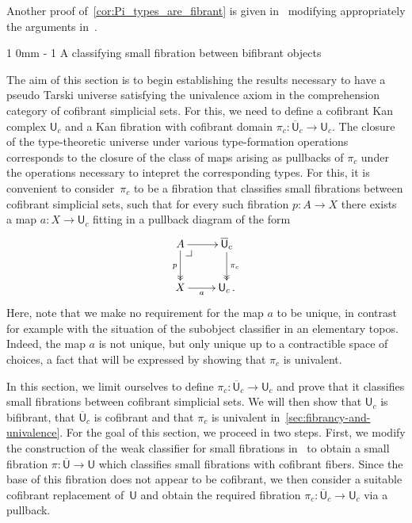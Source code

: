 \documentclass[reqno,10pt,a4paper,oneside,draft]{amsart}
\makeatletter
\renewcommand{\section}{\@startsection
{section}%
{1}%
{0mm}%
{-\baselineskip}%
{1\baselineskip}%
{\Large \bfseries}}%
\numberwithin{equation}{section}
\theoremstyle{mythm}
\theoremstyle{mydef}
\theoremstyle{myrmk}
\newcommand{\pullback}[1]{\save*!/#1-1.2pc/#1:(-1,1)@^{|-}\restore}
\newcommand{\drpullback}{\pullback{dr}}
\newcommand{\ie}{\text{i.e.\ }}
\newcommand{\co}{\colon}
\newcommand{\UU}{\overline{\mathsf{U}}}
\newcommand{\U}{\mathsf{U}}
\makeatother
\begin{document}
 
 Another proof of~\cref{cor:Pi_types_are_fibrant} is given in~\cite{GambinoN:anocp} modifying appropriately
the arguments in~\cite{SattlerC:equepu}.


\section{A  classifying small fibration between bifibrant objects}
\label{sec:unifbb}


The aim of this section is to begin establishing the results necessary to have a pseudo Tarski
universe satisfying the univalence axiom in the comprehension category of cofibrant simplicial
sets. For this, we need to define a cofibrant Kan complex $\U_c$ and a Kan 
fibration with cofibrant domain $\pi_c \co \UU_c \to \U_c$. The closure of the type-theoretic universe under various type-formation operations
corresponds to the closure of the class of maps arising as pullbacks of $\pi_c$ under the 
operations necessary to intepret the corresponding types. For this, it is convenient to 
consider~$\pi_c$ to be a fibration that classifies small fibrations between cofibrant simplicial
sets, \ie such that for every such fibration $p \co A \to X$ there exists a map $a \co X \to \U_c$ fitting in a pullback diagram of the form
\[
\xymatrix{
A \drpullback \ar[r] \ar@{->>}[d]_p   & \UU_c \ar@{->>}[d]^{\pi_c} \\
X \ar[r]_-a &  \U_c \, .}
\]
Here, note that we make no requirement for
the map $a$ to be unique, in contrast for example with the situation of the subobject classifier
in an elementary topos. Indeed, the map $a$ is not unique, but only unique  up to a contractible space
of choices, a fact that will be expressed by showing that $\pi_c$ is univalent. 

In this section, we limit ourselves to define $\pi_c \co \UU_c \to \U_c$ and prove that it
classifies small fibrations between cofibrant simplicial sets. We will then show 
that $\U_c$ is bifibrant, that $\UU_c$ is cofibrant  and that $\pi_c$ is univalent 
in~\cref{sec:fibrancy-and-univalence}. For the goal of this section, we proceed in two steps. First, we modify  the construction of the weak classifier for small fibrations in~\cite{voevodsky-simplicial-model} to obtain a small fibration $\pi \co \UU \to \U$ which classifies small fibrations with cofibrant fibers. Since the base of this fibration does not appear to be cofibrant,
we then consider a suitable cofibrant replacement  of~$\U$ and obtain the required fibration $\pi_c \co \UU_c \to \U_c$ via a pullback. 
\end{document}
